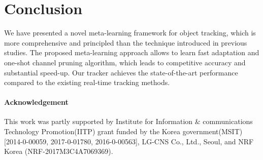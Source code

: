 \documentclass[letterpaper]{article} %
\begin{document}

\section{Conclusion}
\label{sec:conclusion}
We have presented a novel meta-learning framework for object tracking, which is more comprehensive and principled than the technique introduced in previous studies.
The proposed meta-learning approach allows to learn fast adaptation and one-shot channel pruning algorithm, which leads to competitive accuracy and substantial speed-up.
Our tracker achieves the state-of-the-art performance compared to the existing real-time tracking methods.

\paragraph{Acknowledgement}
This work was partly supported by Institute for Information \& communications Technology Promotion(IITP) grant funded by the Korea government(MSIT)[2014-0-00059, 2017-0-01780, 2016-0-00563], LG-CNS Co., Ltd., Seoul, and NRF Korea (NRF-2017M3C4A7069369).
\end{document}
